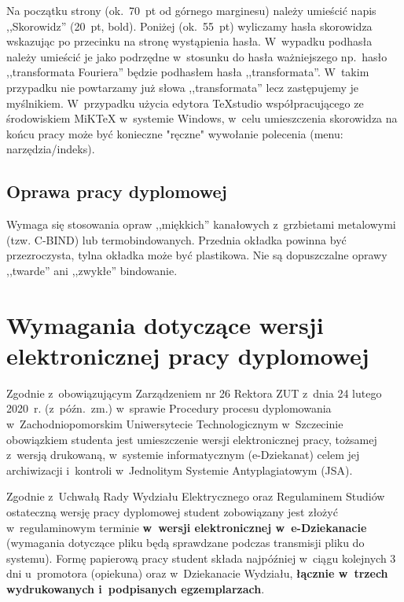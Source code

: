 \documentclass[skorowidz,skroty]{dyplomWEZUT}
\begin{document}
Na początku strony (ok.~70~pt od górnego marginesu) należy umieścić napis ,,Skorowidz'' (20~pt, bold). Poniżej (ok.~55~pt) wyliczamy hasła skorowidza wskazując po przecinku na stronę wystąpienia hasła. W~wypadku podhasła należy umieścić je jako podrzędne w~stosunku do hasła ważniejszego np.~hasło ,,transformata Fouriera'' będzie podhasłem hasła ,,transformata''. W~takim przypadku nie powtarzamy już słowa ,,transformata'' lecz zastępujemy je myślnikiem. W~przypadku użycia edytora TeXstudio współpracującego ze środowiskiem MiKTeX w~systemie Windows, w~celu umieszczenia skorowidza na końcu pracy może być konieczne "ręczne" wywołanie polecenia (menu: narzędzia/indeks).


\section{Oprawa pracy dyplomowej}\label{sec:oprawa}

Wymaga się stosowania opraw ,,miękkich'' kanałowych z~grzbietami metalowymi (tzw. C-BIND) lub termobindowanych. Przednia okładka powinna być przezroczysta, tylna okładka może być plastikowa. Nie są dopuszczalne oprawy ,,twarde'' ani ,,zwykłe'' bindowanie.

\chapter{Wymagania dotyczące wersji elektronicznej pracy dyplomowej}\label{chap:welektroniczna}

Zgodnie z~obowiązującym Zarządzeniem nr 26 Rektora ZUT z~dnia 24 lutego 2020~r. (z~późn.~zm.) w~sprawie Procedury procesu dyplomowania w~Zachodniopomorskim Uniwersytecie Technologicznym w~Szczecinie obowiązkiem studenta jest umieszczenie wersji elektronicznej pracy, tożsamej z~wersją drukowaną, w~systemie informatycznym (e-Dziekanat) celem jej archiwizacji i~kontroli w~Jednolitym Systemie Antyplagiatowym (JSA).

Zgodnie z~Uchwałą Rady Wydziału Elektrycznego oraz Regulaminem Studiów ostateczną wersję pracy dyplomowej student zobowiązany jest złożyć w~regulaminowym terminie \textbf{w~wersji elektronicznej w~e-Dziekanacie} (wymagania dotyczące pliku będą sprawdzane podczas transmisji pliku do systemu). Formę papierową pracy student składa najpóźniej w~ciągu kolejnych 3 dni u~promotora (opiekuna) oraz w~Dziekanacie Wydziału, \textbf{łącznie w~trzech wydrukowanych i~podpisanych egzemplarzach}.
\end{document}
